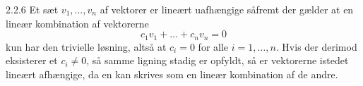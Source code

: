\begin{definition}{2.2.6}
	Et sæt $v_1, \dots, v_n$ af vektorer er lineært uafhængige såfremt der
	gælder at en lineær kombination af vektorerne 
	\[c_1v_1 + \dots + c_nv_n = 0\]
	kun har den trivielle løsning, altså at $c_i = 0$ for alle $i = 1,\dotsc,
	n$. Hvis der derimod eksisterer et $c_i \not= 0$, så samme ligning stadig
	er opfyldt, så er vektorerne istedet lineært afhængige, da en kan skrives
	som en lineær kombination af de andre.
\end{definition}
